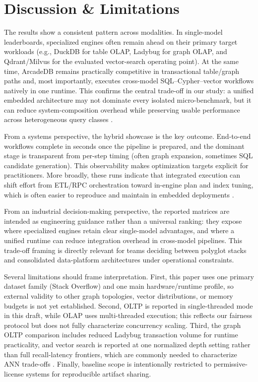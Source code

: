 \documentclass[sigconf, nonacm]{acmart}
\begin{document}
\section{Discussion \& Limitations}

The results show a consistent pattern across modalities. In single-model leaderboards, specialized engines often remain ahead on their primary target workloads (e.g., DuckDB for table OLAP, Ladybug for graph OLAP, and Qdrant/Milvus for the evaluated vector-search operating point). At the same time, ArcadeDB remains practically competitive in transactional table/graph paths and, most importantly, executes cross-model SQL--Cypher--vector workflows natively in one runtime. This confirms the central trade-off in our study: a unified embedded architecture may not dominate every isolated micro-benchmark, but it can reduce system-composition overhead while preserving usable performance across heterogeneous query classes \cite{Lu_2019,Guo_2023,Zhang_2019_Holistic}.

From a systems perspective, the hybrid showcase is the key outcome. End-to-end workflows complete in seconds once the pipeline is prepared, and the dominant stage is transparent from per-step timing (often graph expansion, sometimes SQL candidate generation). This observability makes optimization targets explicit for practitioners. More broadly, these runs indicate that integrated execution can shift effort from ETL/RPC orchestration toward in-engine plan and index tuning, which is often easier to reproduce and maintain in embedded deployments \cite{Ye_2023,Zhang_2019_Holistic}.

From an industrial decision-making perspective, the reported matrices are intended as engineering guidance rather than a universal ranking: they expose where specialized engines retain clear single-model advantages, and where a unified runtime can reduce integration overhead in cross-model pipelines. This trade-off framing is directly relevant for teams deciding between polyglot stacks and consolidated data-platform architectures under operational constraints.

Several limitations should frame interpretation. First, this paper uses one primary dataset family (Stack Overflow) and one main hardware/runtime profile, so external validity to other graph topologies, vector distributions, or memory budgets is not yet established. Second, OLTP is reported in single-threaded mode in this draft, while OLAP uses multi-threaded execution; this reflects our fairness protocol but does not fully characterize concurrency scaling. Third, the graph OLTP comparison includes reduced Ladybug transaction volume for runtime practicality, and vector search is reported at one normalized depth setting rather than full recall-latency frontiers, which are commonly needed to characterize ANN trade-offs \cite{malkov2016efficient,Pan_2024_vldbj}. Finally, baseline scope is intentionally restricted to permissive-license systems for reproducible artifact sharing.
\end{document}
